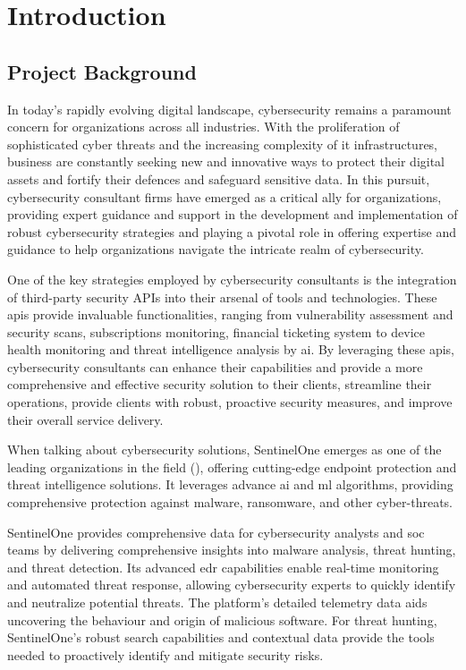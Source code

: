 \chapter{Introduction}

\section{Project Background}

In today's rapidly evolving digital landscape, cybersecurity remains a paramount concern for organizations
across all industries. With the proliferation of sophisticated cyber threats and the increasing complexity of
\acrshort{it} infrastructures, business are constantly seeking new and innovative ways to protect their
digital assets and fortify their defences and safeguard sensitive data. In this pursuit, cybersecurity
consultant firms have emerged as a critical ally for organizations, providing expert guidance and support in
the development and implementation of robust cybersecurity strategies and playing a pivotal role in offering
expertise and guidance to help organizations navigate the intricate realm of cybersecurity.

One of the key strategies employed by cybersecurity consultants is the integration of third-party security
\gls{API}s into their arsenal of tools and technologies. These \acrshort{api}s provide invaluable
functionalities, ranging from vulnerability assessment and security scans, subscriptions monitoring, financial ticketing
system to device health monitoring and threat intelligence analysis by \acrshort{ai}. By leveraging these \acrshort{api}s,
cybersecurity consultants can enhance their capabilities and provide a more comprehensive and effective security solution
to their clients, streamline their operations, provide clients with robust, proactive security measures, and improve
their overall service delivery.

When talking about cybersecurity solutions, SentinelOne emerges as one of the leading organizations in the field
(\textit{\cite{gartnerEDR}}), offering cutting-edge endpoint protection and threat intelligence solutions. It leverages advance
\acrshort{ai} and \acrshort{ml} algorithms, providing comprehensive protection against malware, ransomware, and other cyber-threats.

SentinelOne provides comprehensive data for cybersecurity analysts and \acrshort{soc} teams by delivering comprehensive insights into
malware analysis, threat hunting, and threat detection. Its advanced \acrshort{edr} capabilities enable real-time monitoring and
automated threat response, allowing cybersecurity experts to quickly identify and neutralize potential threats. The platform's
detailed telemetry data aids uncovering the behaviour and origin of malicious software. For threat hunting, SentinelOne's robust
search capabilities and contextual data provide the tools needed to proactively identify and mitigate security risks.

